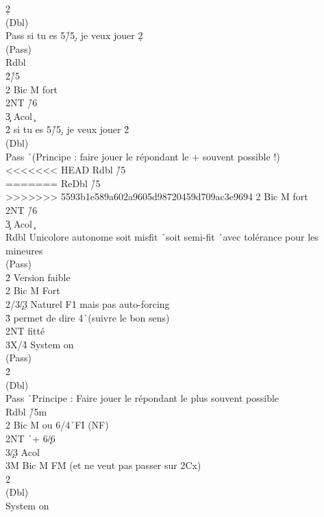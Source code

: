 \documentclass[a4paper]{article}
\begin{document}
\begin{bidtable}
2\d\+\\
(Dbl)\+\\
Pass \> si tu es 5\h /5\d , je veux jouer 2\d \+\\
(Pass)\+\\
Rdbl \h \\
2\h {}\h /5\c \\
2\s \> Bic M fort\\
2NT \h /6\c \\
3\c \> Acol \c \-\-\\
2\h \> si tu es 5\h /5\d , je veux jouer 2\h \+\\
(Dbl)\+\\
Pass \h\ (Principe : faire jouer le répondant le + souvent possible !)\\
<<<<<<< HEAD
Rdbl \h /5\c \\
=======
ReDbl \h /5\c \\
>>>>>>> 5593b1e589a602a9605d98720459d709ac3e9694
2\s \> Bic M fort\\
2NT \h /6\c \\
3\c \> Acol \c \-\-\\
Rdbl \> Unicolore autonome soit misfit \h\ soit semi-fit \h\ avec tolérance pour les mineures\+\\
(Pass)\+\\
2\h \> Version faible\\
2\s \> Bic M Fort\-\-\\
2\s/3\c/3\d \> Naturel F1 mais pas auto-forcing\\
3\h \> permet de dire 4\h\ (suivre le bon sens)\\
2NT \> fitté\\
3X/4\h \> System on\-\\
(Pass)\+\\
2\h\+\\
(Dbl)\+\\
Pass \h\ Principe : Faire jouer le répondant le plus souvent possible\\
Rdbl \h /5m\\
2\s \> Bic M ou 6\s /4\h\ FI (NF)\\
2NT \h\ + 6\c /6\d \\
3\c/3\d \> Acol\\
3M \> Bic M FM (et ne veut pas passer sur 2Cx)\-\-\\
2\s\+\\
(Dbl)\+\\
System \> on\-\-\-\-
\end{bidtable}
\end{document}
